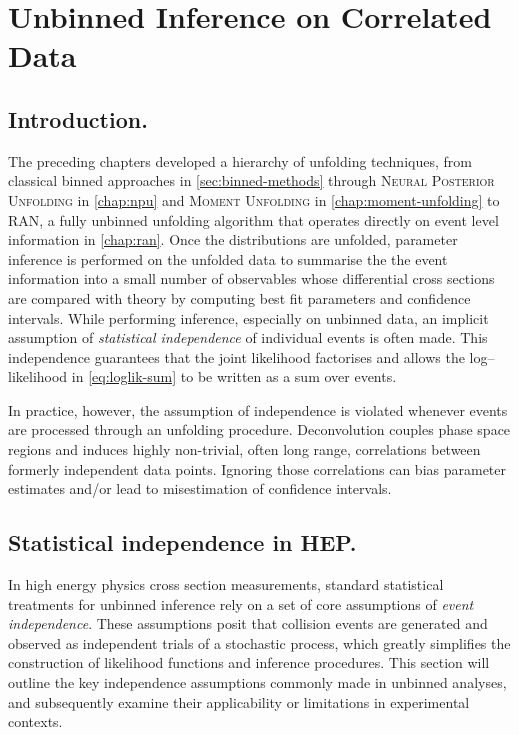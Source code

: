 \chapter{Unbinned Inference on Correlated Data}
\label{chap:unbinned_correlations}
\section{Introduction.}
    The preceding chapters developed a hierarchy of unfolding techniques, from classical binned approaches in \cref{sec:binned-methods} through \textsc{Neural Posterior Unfolding} in \cref{chap:npu} and \textsc{Moment Unfolding} in \cref{chap:moment-unfolding} to RAN, a fully unbinned unfolding algorithm that operates directly on event level information in \cref{chap:ran}.
    Once the distributions are unfolded, parameter inference is performed on the unfolded data to summarise the the event information into a small number of observables whose differential cross sections are compared with theory by computing best fit parameters and confidence intervals.
    While performing inference, especially on unbinned data, an implicit assumption of \emph{statistical independence} of individual events is often made.
    This independence guarantees that the joint likelihood factorises and allows the log--likelihood in \cref{eq:loglik-sum} to be written as a sum over events.
    
    In practice, however, the assumption of independence is violated whenever events are processed through an unfolding procedure.
    Deconvolution couples phase space regions and induces highly non-trivial, often long range, correlations between formerly independent data points.
    Ignoring those correlations can bias parameter estimates and/or lead to misestimation of confidence intervals.
\section{Statistical independence in HEP.}
\label{sec:independence-assumptions}
    In high energy physics cross section measurements, standard statistical treatments for unbinned inference rely on a set of core assumptions of \emph{event independence}. 
    These assumptions posit that collision events are generated and observed as independent trials of a stochastic process, which greatly simplifies the construction of likelihood functions and inference procedures.
    This section will outline the key independence assumptions commonly made in unbinned analyses, and subsequently examine their applicability or limitations in experimental contexts.
